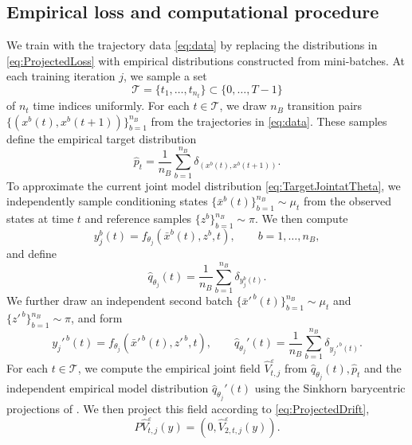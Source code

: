 \documentclass[oneside,11pt]{article}
\theoremstyle{remark}
\begin{document}
\subsection{Empirical loss and computational procedure}
\label{subsec:EmpiricalLoss}
We train with the trajectory data \eqref{eq:data} by replacing the
    distributions in \eqref{eq:ProjectedLoss} with empirical distributions
    constructed from mini-batches. At each training iteration $j$, we sample
    a set
    \[
        \mathcal{T}
        =
        \{t_1,\ldots,t_{n_t}\}
        \subset
        \{0,\ldots,T-1\}
    \]
    of $n_t$ time indices uniformly. 
For each $t\in\mathcal{T}$, we draw $n_B$ transition pairs \\ $\{(x^b(t),x^b(t + 1))\}_{b=1}^{n_B}$
    from the trajectories in \eqref{eq:data}. These samples define the
    empirical target distribution
    \begin{equation}\label{eq:EmpiricalTarget}
        \widehat p_t
        =
        \frac{1}{n_B}
        \sum_{b=1}^{n_B}
        \delta_{(x^b(t),x^b(t+1))}.
    \end{equation}
To approximate the current joint model distribution
    \eqref{eq:TargetJointatTheta}, we independently sample conditioning
    states $\{\bar x^b(t)\}_{b=1}^{n_B}
        \sim \mu_t$ from the observed states at time $t$ and reference samples
    $\{z^b\}_{b=1}^{n_B}\sim\pi$. We then compute
    \[
        y_{j}^b(t)
        =
        f_{\theta_j}(\bar x^b(t),z^b,t),
        \qquad b=1,\ldots,n_B,
    \]
    and define
    \begin{equation}\label{eq:EmpiricalModel}
        \widehat q_{\theta_j}(t)
        =
        \frac{1}{n_B}
        \sum_{b=1}^{n_B}
        \delta_{y_{j}^b(t)}.
    \end{equation}
We further draw an independent second batch
    $\{\bar x'^{\,b}(t)\}_{b=1}^{n_B}\sim\mu_t$ and
    $\{z'^{\,b}\}_{b=1}^{n_B}\sim\pi$, and form
    \[
        y_{j}'^{\,b}(t)
        =
        f_{\theta_j}(\bar x'^{\,b}(t),z'^{\,b},t),
        \qquad
        \widehat q_{\theta_j}'(t)
        =
        \frac{1}{n_B}
        \sum_{b=1}^{n_B}
        \delta_{y_{j}'^{\,b}(t)}.
    \]
For each $t\in\mathcal{T}$, we compute the empirical joint field $\widehat{V}_{t,j}^{\varepsilon}$ from $\widehat q_{\theta_j}(t), \widehat p_t$ and the independent empirical
model distribution $\widehat q_{\theta_j}'(t)$ using the Sinkhorn barycentric projections of
    \cite{han2026wflow}. We then project this field according to
    \eqref{eq:ProjectedDrift},
    \[
        P\widehat V_{t,j}^{\varepsilon}(y)
        =
        \left(
            0,
            \widehat V_{2,t,j}^{\varepsilon}(y)
        \right).
    \]
\end{document}
